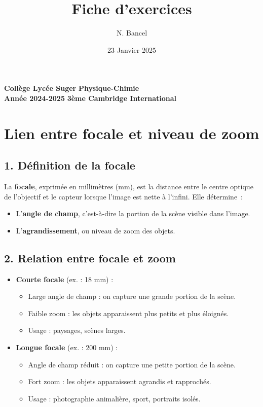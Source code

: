 \documentclass[answers]{exam}
\title{Fiche d'exercices}
\author{N. Bancel}
\date{23 Janvier 2025}
\begin{document}
\textbf{Collège Lycée Suger}
\hfill
\textbf{Physique-Chimie} \\

\textbf{Année 2024-2025}
\hfill
\textbf{3ème Cambridge International} \par

{\let\newpage\relax\maketitle}


\section*{Lien entre focale et niveau de zoom}

\subsection*{1. Définition de la focale}

La \textbf{focale}, exprimée en millimètres (mm), est la distance entre le centre optique de l'objectif et le capteur lorsque l'image est nette à l'infini. Elle détermine :
\begin{itemize}[noitemsep]
    \item L'\textbf{angle de champ}, c'est-à-dire la portion de la scène visible dans l'image.
    \item L'\textbf{agrandissement}, ou niveau de zoom des objets.
\end{itemize}

\subsection*{2. Relation entre focale et zoom}

\begin{itemize}[noitemsep]
    \item \textbf{Courte focale} (ex. : 18 mm) :
    \begin{itemize}[noitemsep]
        \item Large angle de champ : on capture une grande portion de la scène.
        \item Faible zoom : les objets apparaissent plus petits et plus éloignés.
        \item Usage : paysages, scènes larges.
    \end{itemize}
    \item \textbf{Longue focale} (ex. : 200 mm) :
    \begin{itemize}[noitemsep]
        \item Angle de champ réduit : on capture une petite portion de la scène.
        \item Fort zoom : les objets apparaissent agrandis et rapprochés.
        \item Usage : photographie animalière, sport, portraits isolés.
    \end{itemize}
\end{itemize}
\end{document}
